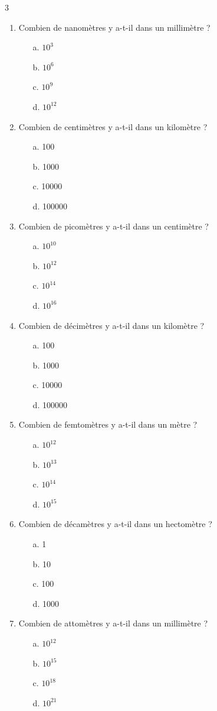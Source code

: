 \documentclass[11pt,a4paper]{article}
\begin{document}
\begin {multicols}{3}
\begin{enumerate}
\item Combien de nanomètres y a-t-il dans un millimètre ?
\begin{enumerate}
\item[a.] $10^3$
\item[b.] $10^6$
\item[c.] $10^9$
\item[d.] $10^{12}$
\end{enumerate}
\item Combien de centimètres y a-t-il dans un kilomètre ?
\begin{enumerate}
\item[a.] 100
\item[b.] 1000
\item[c.] 10000
\item[d.] 100000
\end{enumerate}
\item Combien de picomètres y a-t-il dans un centimètre ?
\begin{enumerate}
\item[a.] $10^{10}$
\item[b.] $10^{12}$
\item[c.] $10^{14}$
\item[d.] $10^{16}$
\end{enumerate}
\item Combien de décimètres y a-t-il dans un kilomètre ?
\begin{enumerate}
\item[a.] 100
\item[b.] 1000
\item[c.] 10000
\item[d.] 100000
\end{enumerate}

\columnbreak


\item Combien de femtomètres y a-t-il dans un mètre ?
\begin{enumerate}
\item[a.] $10^{12}$
\item[b.] $10^{13}$
\item[c.] $10^{14}$
\item[d.] $10^{15}$
\end{enumerate}
\item Combien de décamètres y a-t-il dans un hectomètre ?
\begin{enumerate}
\item[a.] 1
\item[b.] 10
\item[c.] 100
\item[d.] 1000
\end{enumerate}
\item Combien de attomètres y a-t-il dans un millimètre ?
\begin{enumerate}
\item[a.] $10^{12}$
\item[b.] $10^{15}$
\item[c.] $10^{18}$
\item[d.] $10^{21}$
\end{enumerate}
\end{enumerate}


\end{multicols}
\end{document}
